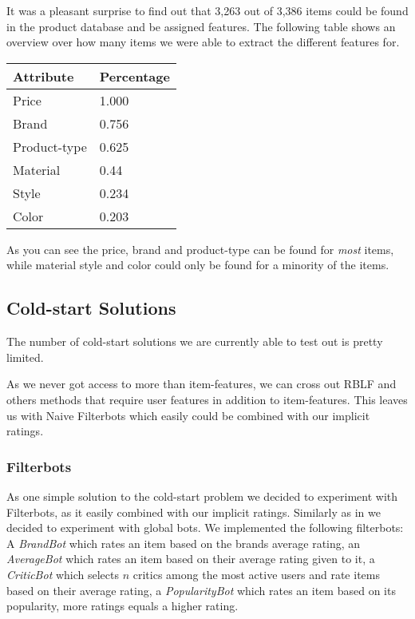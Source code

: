 It was a pleasant surprise to find out that 3,263 out of 3,386 items could be found in the
product database and be assigned features. The following table shows an overview over how many items we were able to extract the different features for.

\begin{table}[H]
	\centering
	\begin{tabular}{l l}
	\toprule
	Attribute & Percentage \\ \midrule
	Price 			& 1.000 \\ 
	Brand 			& 0.756 \\ 
	Product-type 	& 0.625 \\ 
	Material 		& 0.44  \\ 
	Style 			& 0.234 \\ 
	Color 			& 0.203
	\\ \bottomrule
	\end{tabular}
\end{table}

As you can see the price, brand and product-type can be found for \emph{most} items, while material style and color could only be found for a minority of the items.


\subsection{Cold-start Solutions}


The number of cold-start solutions we are currently able to test out is pretty limited.

As we never got access to more than item-features, we can cross out RBLF and others
methods that require user features in addition to item-features. This leaves us with
Naive Filterbots \cite{Park2006} which easily could be combined with our implicit ratings.

\subsubsection{Filterbots}

As one simple solution to the cold-start problem we decided to experiment with Filterbots, as it easily
combined with our implicit ratings. Similarly as in \cite{Park2006} we decided to experiment with global bots.
We implemented the following filterbots: A \emph{BrandBot} which rates an item based on the brands average rating, an \emph{AverageBot} which rates an item based on their average rating given to it, a \emph{CriticBot} which selects $n$ critics among the most active users and rate items based on their average rating, a \emph{PopularityBot} which rates an item based on its popularity, more ratings equals a higher rating.



